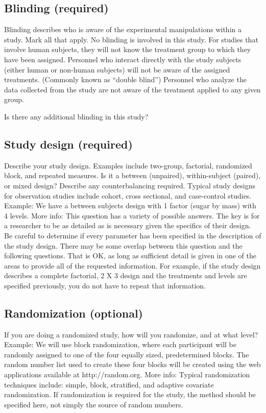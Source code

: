 \documentclass[
10pt, %
a4paper, %
oneside, %
headinclude,footinclude, %
BCOR5mm, %
]{scrartcl}
\begin{document}
\subsection{Blinding (required)}
Blinding describes who is aware of the experimental manipulations within a study. Mark all that apply.
No blinding is involved in this study.
For studies that involve human subjects, they will not know the treatment group to which they have been assigned.
Personnel who interact directly with the study subjects (either human or non-human subjects) will not be aware of the assigned treatments. (Commonly known as “double blind”)
Personnel who analyze the data collected from the study are not aware of the treatment applied to any given group.

Is there any additional blinding in this study?

\subsection{Study design (required)}
Describe your study design. Examples include two-group, factorial, randomized block, and repeated measures. Is it a between (unpaired), within-subject (paired), or mixed design? Describe any counterbalancing required. Typical study designs for observation studies include cohort, cross sectional, and case-control studies.
Example: We have a between subjects design with 1 factor (sugar by mass) with 4 levels. 
More info: This question has a variety of possible answers. The key is for a researcher to be as detailed as is necessary given the specifics of their design. Be careful to determine if every parameter has been specified in the description of the study design. There may be some overlap between this question and the following questions. That is OK, as long as sufficient detail is given in one of the areas to provide all of the requested information. For example, if the study design describes a complete factorial, 2 X 3 design and the treatments and levels are specified previously, you do not have to repeat that information.


\subsection{Randomization (optional)}
If you are doing a randomized study, how will you randomize, and at what level?
Example: We will use block randomization, where each participant will be randomly assigned to one of the four equally sized, predetermined blocks. The random number list used to create these four blocks will be created using the web applications available at http://random.org. 
More info: Typical randomization techniques include: simple, block, stratified, and adaptive covariate randomization. If randomization is required for the study, the method should be specified here, not simply the source of random numbers.
\end{document}
